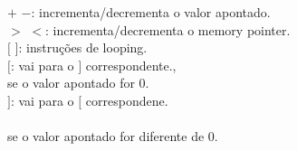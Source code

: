 \documentclass[preview]{standalone}
\begin{document}
$+$ $-$: incrementa/decrementa o valor apontado.\\$>$ $<$: incrementa/decrementa o memory pointer.\\$[$ $]$: instruções de looping.\\$[$: vai para o $]$ correspondente.,\\se o valor apontado for 0.\\$]$: vai para o $[$ correspondene.\\\\se o valor apontado for diferente de 0.\\
\end{document}
